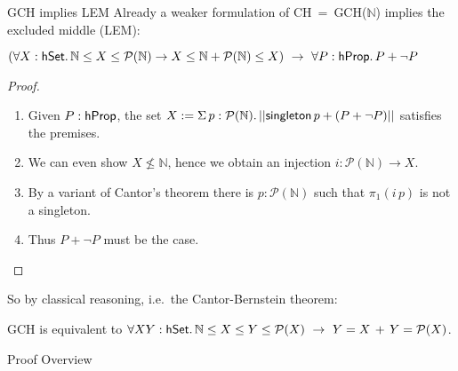 \documentclass[xcolor=dvipsnames,compress,aspectratio=169,handout]{beamer}
\newcommand{\MBB}[1]{\ensuremath{\mathbb{#1}}\xspace}  %
\newcommand{\MCL}[1]{\ensuremath{\mathcal{#1}}\xspace} %
\newcommand{\Nat}{\MBB{N}}   %
\newcommand{\Pow}{\MCL P}
\begin{document}
\begin{frame}{GCH implies LEM}
	Already a weaker formulation of CH$~=~$GCH($\Nat$) implies the excluded middle (LEM):
	\begin{fact}
		$(\forall X:\hset.\,\Nat \le X\le \Pow(\Nat)\to X\le \Nat+ \Pow(\Nat)\le X)~\to~\forall P:\hprop.\,P+\neg P$
	\end{fact}
	\pause
	\begin{proof}
		\begin{enumerate}
			\pause
			\item
			Given $P:\mathsf{hProp}$, the set $X:=\Sigma\, p:\Pow(\Nat).\,\trunc{\mathsf{singleton}\,p+ (P+\neg P)}$ satisfies the premises.
			\pause
			\item
			We can even show $X\not\le \Nat$, hence we obtain an injection $i:\Pow(\Nat)\to X$.
			\pause
			\item
			By a variant of Cantor's theorem there is $p:\Pow(\Nat)$ such that $\pi_1(i\,p)$ is not a singleton.
			\pause
			\item
			Thus $P+\neg P$ must be the case.
			\qedhere
		\end{enumerate}
	\end{proof}
	\pause
	So by classical reasoning, i.e.\ the Cantor-Bernstein theorem:
	\begin{corollary}
		GCH is equivalent to $\forall X Y:\hset.\,\Nat \le X\le Y\le \Pow(X)~\to~ Y = X \,+\, Y=\Pow(X) $.
	\end{corollary}
\end{frame}

\begin{frame}
	\Huge
	\centering
	Proof Overview
\end{frame}
\end{document}

